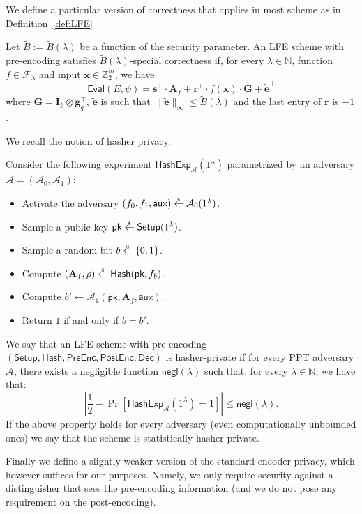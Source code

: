 \documentclass{article}
\newcommand{\getsr}{\overset{\raisebox{-1pt}{$\scriptscriptstyle \$$}}{\gets}}
\newcommand{\sample}{\getsr}
\newcommand{\Pre}{\mathsf{Pre}}
\newcommand{\Post}{\mathsf{Post}}
\newcommand{\N}{\mathbb{N}}
\newcommand{\Z}{\mathbb{Z}}
\newcommand{\negl}{\mathsf{negl}}
\renewcommand{\sec}{\ensuremath{\lambda}}
\newcommand{\aux}{\mathsf{aux}}
\newcommand{\Adv}{\mathcal{A}}
\newcommand{\algofont}[1]{\ensuremath{\mathsf{#1}}}
\newcommand{\Enc}{{\algofont{Enc}}}
\newcommand{\Dec}{{\algofont{Dec}}}
\newcommand{\Setup}{{\algofont{Setup}}}
\newcommand{\Eval}{\algofont{Eval}\xspace}
\newcommand{\Hash}{{\algofont{Hash}}}
\newcommand{\id}{\ensuremath{\mathbf{I}}}
\newcommand{\pk}{{\mathsf{pk}}}
\newcommand{\defref}[1]{Definition~\ref{def:#1}}
\newcommand\bbbone{1}
\begin{document}
We define a particular version of correctness that applies in most scheme as in \defref{LFE}

\begin{definition}
Let $\widetilde{B}:=\widetilde{B}(\sec)$ be a function of the security parameter. An LFE scheme with pre-encoding satisfies $\widetilde{B}(\sec)$-special correctness if, for every $\sec\in\N$, function $f\in\mathcal{F}_\sec$ and input $\mathbf{x}\in\Z_2^m$, we have
\[
\Eval(E, \psi) = \mathbf{s}^\intercal\cdot \mathbf{A}_f+ \mathbf{r}^\intercal\cdot f(\mathbf{x})\cdot \mathbf{G}+\mathbf{\widetilde{e}}^\intercal
\]
where $\mathbf{G}=\id_k\otimes \mathbf{g}_q^\intercal$, $\mathbf{\widetilde{e}}$ is such that $\lVert\mathbf{\widetilde{e}}\rVert_\infty\le \widetilde{B}(\sec)$ and the last entry of $\mathbf{r}$ is $-1$.
\end{definition}
We recall the notion of hasher privacy.
\begin{definition}
Consider the following experiment $\mathsf{HashExp}_{\mathcal{A}}(\bbbone^\sec)$ parametrized by an adversary $\mathcal{A} = (\mathcal{A}_0, \mathcal{A}_1)$:
\begin{itemize}
    \item Activate the adversary $(f_0, f_1, \aux)\sample\Adv_0(\bbbone^\sec)$.
    \item Sample a public key $\pk\sample\Setup(\bbbone^\sec)$.
    \item Sample a random bit $b\sample\{0, 1\}$. 
    \item Compute $(\mathbf{A}_f, \rho)\sample\Hash(\pk, f_b)$.
    \item Compute $b' \gets \Adv_1(\pk, \mathbf{A}_f, \aux)$.
    \item Return $1$ if and only if $b =b'$.
\end{itemize}
We say that an LFE scheme with pre-encoding $(\Setup, \Hash, \Pre\Enc, \Post\Enc, \Dec)$ is hasher-private if for every PPT adversary $\mathcal{A}$, there exists a negligible function $\negl(\sec)$ such that, for every $\sec\in\N$, we have that:
\[
\left|\frac{1}{2} - \Pr\left[\mathsf{HashExp}_{\mathcal{A}}(\bbbone^\sec) = 1\right] \right|\le\negl(\sec).
\]
If the above property holds for every adversary (even computationally unbounded ones) we say that the scheme is statistically hasher private.
\end{definition}
Finally we define a slightly weaker version of the standard encoder privacy, which however suffices for our purposes. Namely, we only require security against a distinguisher that sees the pre-encoding information (and we do not pose any requirement on the post-encoding).
\end{document}

